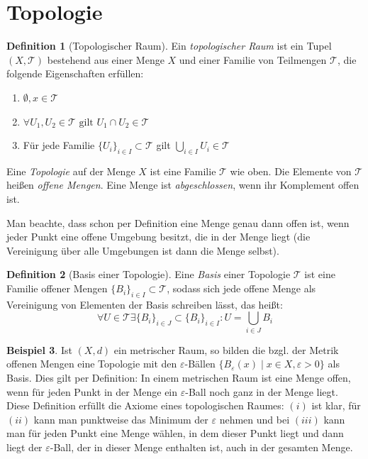 \documentclass[a4paper]{scrbook}
\numberwithin{equation}{chapter}
\theoremstyle{definition}
\newtheorem{defn}{Definition}[section]
\newtheorem{bsp}[defn]{Beispiel}
\begin{document}
	\section{Topologie}
		\begin{defn}[Topologischer Raum]
			Ein \emph{topologischer Raum} ist ein Tupel $(X,\mathcal{T})$ bestehend aus einer Menge $X$ und einer Familie von Teilmengen $\mathcal{T}$, die folgende Eigenschaften erfüllen:
			\begin{enumerate}[label=(\roman*)]
				\item $\emptyset, x\in \mathcal{T}$
				\item $\forall U_1, U_2\in \mathcal{T} \text{ gilt }U_1\cap U_2\in\mathcal{T}$
				\item Für jede Familie $\lbrace U_i\rbrace_{i\in I}\subset \mathcal{T}$ gilt $\bigcup_{i\in I}U_i\in\mathcal{T}$
			\end{enumerate}
			Eine \emph{Topologie} auf der Menge $X$ ist eine Familie $\mathcal{T}$ wie oben. Die Elemente von $\mathcal{T}$ heißen \emph{offene Mengen}. Eine Menge ist \emph{abgeschlossen}, wenn ihr Komplement offen ist.
			
			Man beachte, dass schon per Definition eine Menge genau dann offen ist, wenn jeder Punkt eine offene Umgebung besitzt, die in der Menge liegt (die Vereinigung über alle Umgebungen ist dann die Menge selbst).
		\end{defn}
		\begin{defn}[Basis einer Topologie]
			Eine \emph{Basis} einer Topologie $\mathcal{T}$ ist eine Familie offener Mengen $\lbrace B_i\rbrace_{i\in I}\subset \mathcal{T}$, sodass sich jede offene Menge als Vereinigung von Elementen der Basis schreiben lässt, das heißt:
			\begin{equation*}
				\forall U\in\mathcal{T}\exists \lbrace B_i\rbrace_{i\in J}\subset \lbrace B_i\rbrace_{i\in I}: U=\bigcup_{i\in J}B_i
			\end{equation*}
		\end{defn}
		\begin{bsp}
			Ist $(X,d)$ ein metrischer Raum, so bilden die bzgl. der Metrik offenen Mengen eine Topologie mit den $\varepsilon$-Bällen $\lbrace B_{\varepsilon}(x)\mid x\in X, \varepsilon >0\rbrace$ als Basis. Dies gilt per Definition: In einem metrischen Raum ist eine Menge offen, wenn für jeden Punkt in der Menge ein $\varepsilon$-Ball noch ganz in der Menge liegt. Diese Definition erfüllt die Axiome eines topologischen Raumes: $(i)$ ist klar, für $(ii)$ kann man punktweise das Minimum der $\varepsilon$ nehmen und bei $(iii)$ kann man für jeden Punkt eine Menge wählen, in dem dieser Punkt liegt und dann liegt der $\varepsilon$-Ball, der in dieser Menge enthalten ist, auch in der gesamten Menge.
		\end{bsp}
\end{document}
